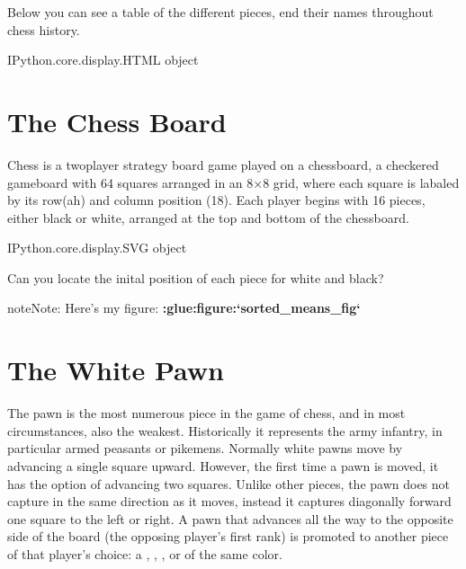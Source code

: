 \documentclass[letterpaper,10pt,english]{jupyterBook}
\begin{document}
\sphinxAtStartPar
Below you can see a table of the different pieces, end their names throughout chess history.

\begin{sphinxVerbatim}[commandchars=\\\{\}]
\PYGZlt{}IPython.core.display.HTML object\PYGZgt{}
\end{sphinxVerbatim}


\section{The Chess Board}
\label{\detokenize{chapter1:id1}}
\sphinxAtStartPar
Chess is a two\sphinxhyphen{}player strategy board game played on a chessboard, a checkered gameboard with 64 squares arranged in an 8×8 grid, where each square is labaled by its row(a\sphinxhyphen{}h) and column position (1\sphinxhyphen{}8). Each player begins with 16 pieces, either black or white, arranged at the top and bottom of the chessboard.

\begin{sphinxVerbatim}[commandchars=\\\{\}]
\PYGZlt{}IPython.core.display.SVG object\PYGZgt{}
\end{sphinxVerbatim}

\sphinxAtStartPar
{} Can you locate the inital position of each piece for white and black?

\begin{sphinxadmonition}{note}{Note:}
\sphinxAtStartPar
Here’s my figure:
{\color{red}\bfseries{}:glue:figure:`sorted\_means\_fig`}
\end{sphinxadmonition}


\section{The White Pawn}
\label{\detokenize{chapter1:the-white-pawn}}
\sphinxAtStartPar
The pawn is the most numerous piece in the game of chess, and in most circumstances, also the weakest. Historically it represents the army infantry, in particular armed peasants or pikemens. Normally white pawns move by advancing a single square upward. However, the first time a pawn is moved, it has the option of advancing two squares. Unlike other pieces, the pawn does not capture in the same direction as it moves, instead it captures diagonally forward one square to the left or right. A pawn that advances all the way to the opposite side of the board (the opposing player’s first rank) is promoted to another piece of that player’s choice: a , , , or  of the same color.
\end{document}
